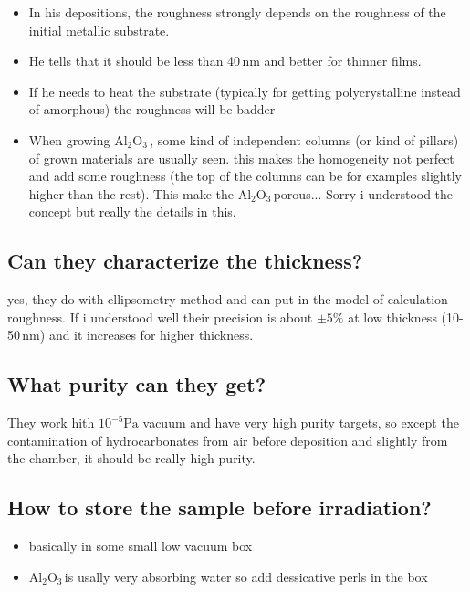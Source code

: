 \documentclass[11pt]{article}
\newcommand{\Alumina}{Al$_2$O$_3$\,}
\begin{document}
\begin{itemize}
\item In his depositions, the roughness strongly depends on the roughness of the initial metallic substrate.
\item He tells that it should be less than 40\,nm and better for thinner films.
\item If he needs to heat the substrate (typically for getting polycrystalline instead of amorphous) the roughness will be badder
\item When growing \Alumina, some kind of independent columns (or kind of pillars) of grown materials are usually seen. this makes the homogeneity not perfect and add some roughness (the top of the columns can be for examples slightly higher than the rest). This make the \Alumina porous... Sorry i understood the concept but really the details in this.
\end{itemize}

\subsection*{Can they characterize the thickness?}

yes, they do with ellipsometry method and can put in the model of calculation roughness. If i understood well their precision is about $\pm5\%$ at low thickness (10-50\,nm) and it increases for higher thickness.

\subsection*{What purity can they get?}

They work hith $10^{-5}\mathrm{Pa}$ vacuum and have very high purity targets, so except the contamination of hydrocarbonates from air before deposition and slightly from the chamber, it should be really high purity.

\subsection*{How to store the sample before irradiation?}

\begin{itemize}
\item basically in some small low vacuum box
\item \Alumina is usally very absorbing water so add dessicative perls in the box
\end{itemize}
\end{document}
